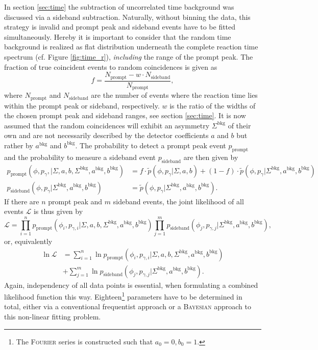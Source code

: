 In section \ref{sec:time} the subtraction of uncorrelated time background was discussed via a sideband subtraction. Naturally, without binning the data, this strategy is invalid and prompt peak and sideband events have to be fitted simultaneously. Hereby it is important to consider that the random time background is realized as flat distribution underneath the complete reaction time spectrum (cf. Figure \ref{fig:time_r}), \emph{including} the range of the prompt peak. The fraction of true coincident events to random coincidences is given as \begin{equation}
	f=\frac{N_\text{prompt}-w\cdot N_\text{sideband}}{N_\text{prompt}},
\end{equation}
where $N_\text{prompt}$ and $N_\text{sideband}$ are the number of events where the reaction time lies within the prompt peak or sideband, respectively. $w$ is the ratio of the widths of the chosen prompt peak and sideband
ranges, see section \ref{sec:time}. It is now assumed that the random coincidences will exhibit an asymmetry $\Sigma^\text{bkg}$ of their own and are not necessarily described by the detector coefficients $a$ and $b$ but rather by $a^\text{bkg}$ and $b^\text{bkg}$. The probability to detect a prompt peak event $p_\text{prompt}$ and the probability to measure a sideband event $p_\text{sideband}$ are then given by 
\begin{align}
p_\text{prompt}\left(\phi,p_\gamma,\big|\Sigma,a,b,\Sigma^\text{bkg},a^\text{bkg},b^\text{bkg}\right)&=f\cdot\tilde{p}\left(\phi,p_\gamma\big|\Sigma,a,b\right)+\left(1-f\right)\cdot\tilde{p}\left(\phi,p_\gamma\big|\Sigma^\text{bkg},a^\text{bkg},b^\text{bkg}\right)\label{eq:pprmpt}\\
p_\text{sideband}\left(\phi,p_\gamma\big|\Sigma^\text{bkg},a^\text{bkg},b^\text{bkg}\right)&=\tilde{p}\left(\phi,p_\gamma\big|\Sigma^\text{bkg},a^\text{bkg},b^\text{bkg}\right)\label{eq:pside}.
\end{align}
If there are $n$ prompt peak and $m$ sideband events, the joint likelihood of all events $\mathcal{L}$ is thus given by
\begin{equation}
	\mathcal{L}=\prod_{i=1}^{n}p_\text{prompt}\left(\phi_i,p_{\gamma,i}\big|\Sigma,a,b,\Sigma^\text{bkg},a^\text{bkg},b^\text{bkg}\right)\prod_{j=1}^mp_\text{sideband}\left(\phi_j,p_{\gamma,j}\big|\Sigma^\text{bkg},a^\text{bkg},b^\text{bkg}\right),
\end{equation}
or, equivalently
\begin{equation}
\begin{aligned}
	\ln\mathcal{L}&=\sum_{i=1}^{n}\ln p_\text{prompt}\left(\phi_i,p_{\gamma,i}\big|\Sigma,a,b,\Sigma^\text{bkg},a^\text{bkg},b^\text{bkg}\right)\\&+\sum_{j=1}^m \ln p_\text{sideband}\left(\phi_j,p_{\gamma,j}\big|\Sigma^\text{bkg},a^\text{bkg},b^\text{bkg}\right).\label{eq:lik}
\end{aligned}
\end{equation}
Again, independency of all data points is essential, when formulating a combined likelihood function this way.
Eighteen\footnote{The \textsc{Fourier} series is constructed such that $a_0=0,b_0=1$.} parameters have to be determined in total, either via a conventional frequentist approach or a \textsc{Bayesian} approach to this non-linear fitting problem.
